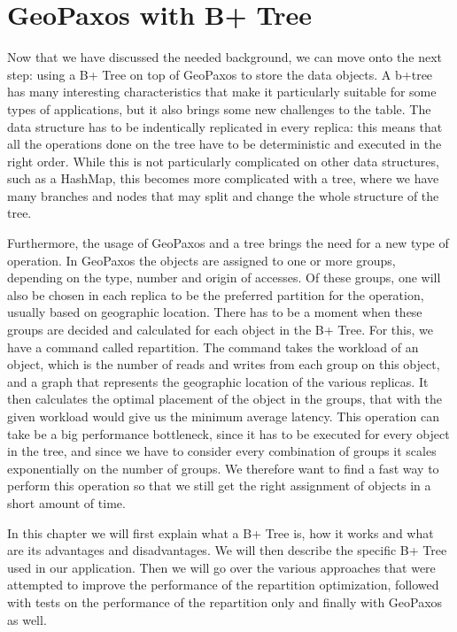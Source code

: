 \chapter{GeoPaxos with B+ Tree}\label{sec:geopaxos-with-b+tree}
Now that we have discussed the needed background, we can move onto the next step: using a B+ Tree on top of GeoPaxos to store the data objects. A b+tree has many interesting characteristics that make it particularly suitable for some types of applications, but it also brings some new challenges to the table. The data structure has to be indentically replicated in every replica: this means that all the operations done on the tree have to be deterministic and executed in the right order. While this is not particularly complicated on other data structures, such as a HashMap, this becomes more complicated with a tree, where we have many branches and nodes that may split and change the whole structure of the tree.

Furthermore, the usage of GeoPaxos and a tree brings the need for a new type of operation. In GeoPaxos the objects are assigned to one or more groups, depending on the type, number and origin of accesses. Of these groups, one will also be chosen in each replica to be the preferred partition for the operation, usually based on geographic location. There has to be a moment when these groups are decided and calculated for each object in the B+ Tree. For this, we have a command called repartition. The command takes the workload of an object, which is the number of reads and writes from each group on this object, and a graph that represents the geographic location of the various replicas. It then calculates the optimal placement of the object in the groups, that with the given workload would give us the minimum average latency. This operation can take be a big performance bottleneck, since it has to be executed for every object in the tree, and since we have to consider every combination of groups it scales exponentially on the number of groups. We therefore want to find a fast way to perform this operation so that we still get the right assignment of objects in a short amount of time.

In this chapter we will first explain what a B+ Tree is, how it works and what are its advantages and disadvantages. We will then describe the specific B+ Tree used in our application. Then we will go over the various approaches that were attempted to improve the performance of the repartition optimization, followed with tests on the performance of the repartition only and finally with GeoPaxos as well.

